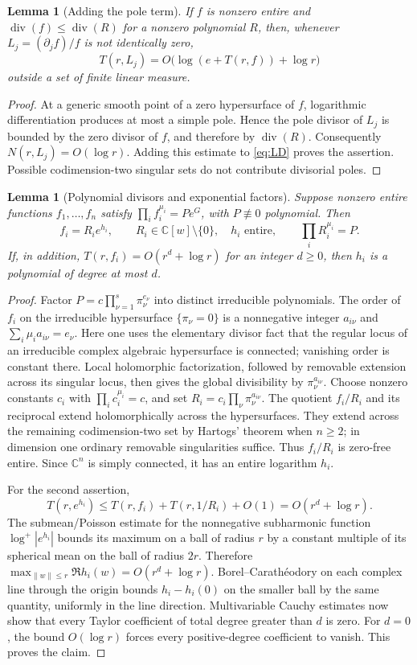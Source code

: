 \documentclass[11pt]{article}
\numberwithin{equation}{section}
\newtheorem{lemma}[theorem]{Lemma}
\theoremstyle{definition}\newtheorem{definition}[theorem]{Definition}
\theoremstyle{remark}\newtheorem{remark}[theorem]{Remark}
\newcommand{\C}{\mathbb C}
\newcommand{\Div}{\operatorname{div}}
\begin{document}
\begin{lemma}[Adding the pole term]\label{lem:LD}
If $f$ is nonzero entire and $\Div(f)\leq\Div(R)$ for a nonzero
polynomial $R$, then, whenever $L_j=(\partial_j f)/f$ is not identically
zero,
\[
 T(r,L_j)=O\bigl(\log(e+T(r,f))+\log r\bigr)
\]
outside a set of finite linear measure.
\end{lemma}
\begin{proof}
At a generic smooth point of a zero hypersurface of $f$, logarithmic
differentiation produces at most a simple pole. Hence the pole divisor of
$L_j$ is bounded by the zero divisor of $f$, and therefore by $\Div(R)$.
Consequently $N(r,L_j)=O(\log r)$. Adding this estimate to
\eqref{eq:LD} proves the assertion. Possible codimension-two singular sets
do not contribute divisorial poles.
\end{proof}

\begin{lemma}[Polynomial divisors and exponential factors]\label{lem:factor}
Suppose nonzero entire functions $f_1,\ldots,f_n$ satisfy
$\prod_i f_i^{\mu_i}=P e^G$, with $P\not\equiv0$ polynomial. Then
\[
 f_i=R_i e^{h_i},\qquad R_i\in\C[w]\setminus\{0\},\quad
 h_i\text{ entire},\qquad \prod_i R_i^{\mu_i}=P.
\]
If, in addition, $T(r,f_i)=O(r^d+\log r)$ for an integer $d\geq0$,
then $h_i$ is a polynomial of degree at most $d$.
\end{lemma}
\begin{proof}
Factor $P=c\prod_{\nu=1}^s\pi_\nu^{e_\nu}$ into distinct irreducible
polynomials. The order of $f_i$ on the irreducible hypersurface
$\{\pi_\nu=0\}$ is a nonnegative integer $a_{i\nu}$ and
$\sum_i\mu_i a_{i\nu}=e_\nu$. Here one uses the elementary divisor fact
that the regular locus of an irreducible complex algebraic hypersurface
is connected; vanishing order is constant there. Local holomorphic
factorization, followed by removable extension across its singular locus,
then gives the global divisibility by $\pi_\nu^{a_{i\nu}}$.
Choose nonzero constants $c_i$ with $\prod_i c_i^{\mu_i}=c$, and set
$R_i=c_i\prod_\nu\pi_\nu^{a_{i\nu}}$. The quotient $f_i/R_i$ and its
reciprocal extend holomorphically across the hypersurfaces. They extend
across the remaining codimension-two set by Hartogs' theorem when
$n\geq2$; in dimension one ordinary removable singularities suffice.
Thus $f_i/R_i$ is zero-free entire. Since $\C^n$ is simply connected,
it has an entire logarithm $h_i$.

For the second assertion,
\[
 T(r,e^{h_i})\leq T(r,f_i)+T(r,1/R_i)+O(1)
 =O(r^d+\log r).
\]
The submean/Poisson estimate for the nonnegative subharmonic function
$\log^+|e^{h_i}|$ bounds its maximum on a ball of radius $r$ by a constant
multiple of its spherical mean on the ball of radius $2r$. Therefore
$\max_{\|w\|\leq r}\Re h_i(w)=O(r^d+\log r)$. Borel--Carath\'eodory
on each complex line through the origin bounds $h_i-h_i(0)$ on the
smaller ball by the same quantity, uniformly in the line direction.
Multivariable Cauchy estimates now show that every Taylor coefficient of
total degree greater than $d$ is zero. For $d=0$, the bound $O(\log r)$
forces every positive-degree coefficient to vanish. This proves the claim.
\end{proof}
\end{document}
